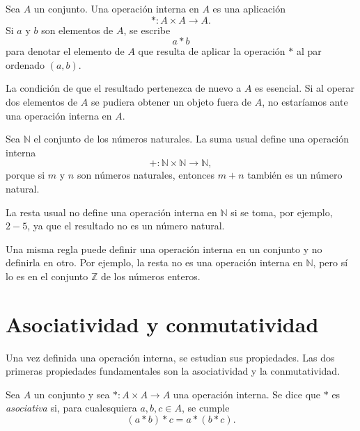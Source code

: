 \begin{definicion}
Sea \(A\) un conjunto. Una operación interna en \(A\) es una aplicación
\[
  *:A\times A\longrightarrow A.
\]
Si \(a\) y \(b\) son elementos de \(A\), se escribe
\[
  a*b
\]
para denotar el elemento de \(A\) que resulta de aplicar la operación \(*\) al par ordenado \((a,b)\).
\end{definicion}

La condición de que el resultado pertenezca de nuevo a \(A\) es esencial. Si al operar dos elementos de \(A\) se pudiera obtener un objeto fuera de \(A\), no estaríamos ante una operación interna en \(A\).

\begin{ejemplo}
Sea \(\mathbb{N}\) el conjunto de los números naturales. La suma usual define una operación interna
\[
  +:\mathbb{N}\times \mathbb{N}\longrightarrow \mathbb{N},
\]
porque si \(m\) y \(n\) son números naturales, entonces \(m+n\) también es un número natural.
\end{ejemplo}

\begin{ejemplo}
La resta usual no define una operación interna en \(\mathbb{N}\) si se toma, por ejemplo, \(2-5\), ya que el resultado no es un número natural.
\end{ejemplo}

\begin{advertencia}
Una misma regla puede definir una operación interna en un conjunto y no definirla en otro. Por ejemplo, la resta no es una operación interna en \(\mathbb{N}\), pero sí lo es en el conjunto \(\mathbb{Z}\) de los números enteros.
\end{advertencia}

\section{Asociatividad y conmutatividad}

Una vez definida una operación interna, se estudian sus propiedades. Las dos primeras propiedades fundamentales son la asociatividad y la conmutatividad.

\begin{definicion}[Asociatividad]
Sea \(A\) un conjunto y sea \(*:A\times A\to A\) una operación interna. Se dice que \(*\) es \emph{asociativa} si, para cualesquiera \(a,b,c\in A\), se cumple
\[
  (a*b)*c=a*(b*c).
\]
\end{definicion}

